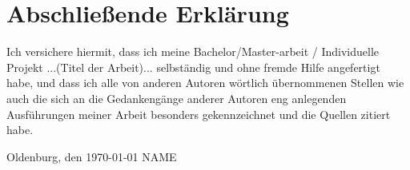 \documentclass[11pt]{scrartcl}
\begin{document}
\clearpage


\clearpairofpagestyles

\section*{Abschließende Erklärung}
Ich versichere hiermit, dass ich meine Bachelor/Master-arbeit / Individuelle Projekt ...(Titel der Arbeit)... selbständig und ohne fremde Hilfe angefertigt habe, und dass ich alle von anderen Autoren wörtlich übernommenen Stellen wie auch die sich an die Gedankengänge anderer Autoren eng anlegenden Ausführungen meiner Arbeit besonders gekennzeichnet und die Quellen zitiert habe.

\vspace*{3cm}
\noindent Oldenburg, den \today \hspace*{2cm} NAME

\end{document}
